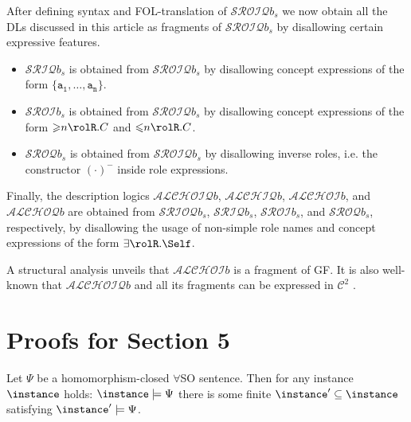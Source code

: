 \medskip

After defining syntax and FOL-translation of $\mathcal{SROIQ}b_s$ we now obtain all the DLs discussed in this article as fragments of $\mathcal{SROIQ}b_s$ by disallowing certain expressive features.

\begin{itemize}
\item $\mathcal{SRIQ}b_s$ is obtained from $\mathcal{SROIQ}b_s$ by disallowing concept expressions of the form $\{\mathtt{a_1}, \ldots, \mathtt{a_n}\}$.
\item $\mathcal{SROI}b_s$ is obtained from $\mathcal{SROIQ}b_s$ by disallowing concept expressions of the form
${\geqslant}n\rolR. C$ and ${\leqslant}n\rolR. C$. 
\item $\mathcal{SROQ}b_s$ is obtained from $\mathcal{SROIQ}b_s$ by disallowing inverse roles, i.e. the constructor $(\cdot)^-$ inside role expressions.	
\end{itemize} 
Finally, the description logics $\mathcal{ALCHOIQ}b$, $\mathcal{ALCHIQ}b$, $\mathcal{ALCHOI}b$, and $\mathcal{ALCHOQ}b$ are obtained from $\mathcal{SRIOQ}b_s$, $\mathcal{SRIQ}b_s$, $\mathcal{SROI}b_s$, and $\mathcal{SROQ}b_s$, respectively, by disallowing the usage of non-simple role names and concept expressions of the form $\exists\rolR.\Self$.

A structural analysis unveils that $\mathcal{ALCHOI}b$ is a fragment of GF. It is also well-known that $\mathcal{ALCHOIQ}b$ and all its fragments can be expressed in $\mathcal{C}^2$ \cite{RudolphKH08b}.


\section{Proofs for Section 5}

\begin{lemma}\label{lem:interesting}
Let $\Psi$ be a homomorphism-closed $\forall$SO sentence.
Then for any instance $\instance$ holds: $\instance \models \Psi$ \iffi there is some finite $\instance' \subseteq \instance$ satisfying $\instance' \models \Psi$.
\end{lemma}

